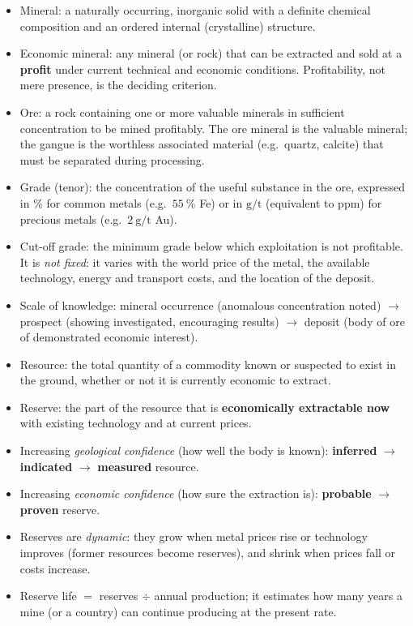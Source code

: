 \documentclass[11pt]{article}
\newcommand{\cle}[1]{{\popxbold\color{popdark}#1}}
\begin{document}
\begin{aretenir}
\begin{itemize}
\item \cle{Mineral}: a naturally occurring, inorganic solid with a definite chemical composition and an ordered internal (crystalline) structure.
\item \cle{Economic mineral}: any mineral (or rock) that can be extracted and sold at a \textbf{profit} under current technical and economic conditions. Profitability, not mere presence, is the deciding criterion.
\item \cle{Ore}: a rock containing one or more valuable minerals in sufficient concentration to be mined profitably. The \cle{ore mineral} is the valuable mineral; the \cle{gangue} is the worthless associated material (e.g.\ quartz, calcite) that must be separated during processing.
\item \cle{Grade (tenor)}: the concentration of the useful substance in the ore, expressed in \% for common metals (e.g.\ $55\ \%$ Fe) or in $\mathrm{g/t}$ (equivalent to ppm) for precious metals (e.g.\ $2\ \mathrm{g/t}$ Au).
\item \cle{Cut-off grade}: the minimum grade below which exploitation is not profitable. It is \emph{not fixed}: it varies with the world price of the metal, the available technology, energy and transport costs, and the location of the deposit.
\item Scale of knowledge: \cle{mineral occurrence} (anomalous concentration noted) $\rightarrow$ \cle{prospect} (showing investigated, encouraging results) $\rightarrow$ \cle{deposit} (body of ore of demonstrated economic interest).
\end{itemize}
\end{aretenir}

\begin{aretenir}
\begin{itemize}
\item \cle{Resource}: the total quantity of a commodity known or suspected to exist in the ground, whether or not it is currently economic to extract.
\item \cle{Reserve}: the part of the resource that is \textbf{economically extractable now} with existing technology and at current prices.
\item Increasing \emph{geological confidence} (how well the body is known): \textbf{inferred} $\rightarrow$ \textbf{indicated} $\rightarrow$ \textbf{measured} resource.
\item Increasing \emph{economic confidence} (how sure the extraction is): \textbf{probable} $\rightarrow$ \textbf{proven} reserve.
\item Reserves are \emph{dynamic}: they grow when metal prices rise or technology improves (former resources become reserves), and shrink when prices fall or costs increase.
\item \cle{Reserve life} $=$ reserves $\div$ annual production; it estimates how many years a mine (or a country) can continue producing at the present rate.
\end{itemize}
\end{aretenir}
\end{document}
